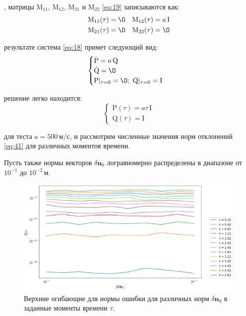 \documentclass[12pt, cleqn, a4paper]{article}
\newcommand{\bfv}[1]{\mathbf{#1}}
\newcommand{\dd}[1]{\dot{#1}}
\newcommand{\dn}{\delta \bfv{n}}
\newcommand{\matr}[1]{\mathrm{#1}}
\begin{document}
, матрицы $\matr{M}_{11}$, $\matr{M}_{12}$, $\matr{M}_{21}$ и $\matr{M}_{22}$ \eqref{eq:19} записываются как:
\begin{align*} 
&\matr{M}_{11}(\tau) = \matr{\O}&\matr{M}_{12}(\tau) = a\,\matr{I}\\
&\matr{M}_{21}(\tau) = \matr{\O}&\matr{M}_{22}(\tau) = \matr{\O}
\end{align*}

 результате система \eqref{eq:18} примет следующий вид:
\begin{equation} \label{eq:41}
\begin{cases}
\dd{\matr{P}} = a\,\matr{Q}\\
\dd{\matr{Q}} = \matr{\O}\\
\matr{P}|_{\tau=0} = \matr{\O}; \ \matr{Q}|_{\tau=0} = \matr{I}
\end{cases}
\end{equation}

 решение легко находится:
\begin{equation} \label{eq:42}
\begin{cases}
\matr{P}(\tau) = a\tau\,\matr{I}\\
\matr{Q}(\tau) = \matr{I}
\end{cases}
\end{equation}

 для теста $a = 500$\,м/с, и рассмотрим численные значения норм отклонений \eqref{eq:41} для различных моментов времени.

Пусть также нормы векторов $\dn_0$ логравномерно распределены в диапазоне от $10^{-1}$ до $10^{-2}$\,м.

\begin{figure}[H] 
\centering
\includegraphics[width=1.0\linewidth]{errline_const.eps}
\caption{Верхние огибающие для нормы ошибки для различных норм $\dn_0$ в заданные моменты времени $\tau$.}
\label{fig:errline_const}
\end{figure}
\end{document}
